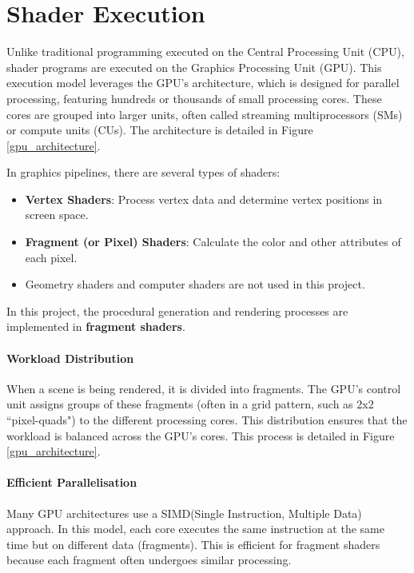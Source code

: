 

\section{Shader Execution}
\label{GPU}

Unlike traditional programming executed on the Central Processing Unit (CPU), shader programs are executed on the Graphics Processing Unit (GPU). This execution model leverages the GPU’s architecture, which is designed for parallel processing, featuring hundreds or thousands of small processing cores. These cores are grouped into larger units, often called streaming multiprocessors (SMs) or compute units (CUs). The architecture is detailed in Figure \ref{gpu_architecture}.

In graphics pipelines, there are several types of shaders:
\begin{itemize}
    \item \textbf{Vertex Shaders}: Process vertex data and determine vertex positions in screen space.
    \item \textbf{Fragment (or Pixel) Shaders}: Calculate the color and other attributes of each pixel.
    \item Geometry shaders and computer shaders are not used in this project.
\end{itemize}

In this project, the procedural generation and rendering processes are implemented in \textbf{fragment shaders}.

\paragraph{Workload Distribution}
When a scene is being rendered, it is divided into fragments. The GPU's control unit assigns groups of these fragments (often in a grid pattern, such as 2x2 ``pixel-quads") to the different processing cores. This distribution ensures that the workload is balanced across the GPU's cores. This process is detailed in Figure \ref{gpu_architecture}.

\paragraph{Efficient Parallelisation}
Many GPU architectures use a SIMD(Single Instruction, Multiple Data) approach. In this model, each core executes the same instruction at the same time but on different data (fragments). This is efficient for fragment shaders because each fragment often undergoes similar processing.

